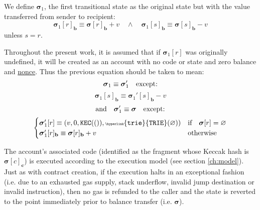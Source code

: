 \documentclass[9pt,oneside]{amsart}
\begin{document}
\begin{multicols}{2}
We define $\boldsymbol{\sigma}_1$, the first transitional state as the original state but with the value transferred from sender to recipient:
\begin{equation}
\boldsymbol{\sigma}_1[r]_\mathbf{b} \equiv \boldsymbol{\sigma}[r]_\mathbf{b} + v \quad\wedge\quad \boldsymbol{\sigma}_1[s]_\mathbf{b} \equiv \boldsymbol{\sigma}[s]_\mathbf{b} - v
\end{equation}
unless $s = r$.

Throughout the present work, it is assumed that if $\boldsymbol{\sigma}_1[r]$ was originally undefined, it will be created as an account with no code or state and zero balance and \hyperlink{account nonce}{nonce}. Thus the previous equation should be taken to mean:
\begin{equation}
\boldsymbol{\sigma}_1 \equiv \boldsymbol{\sigma}_1' \quad \text{except:} \\
\end{equation}
\begin{equation}
\boldsymbol{\sigma}_1[s]_\mathbf{b} \equiv \boldsymbol{\sigma}_1'[s]_\mathbf{b} - v
\end{equation}
\begin{equation}
\text{and}\quad \boldsymbol{\sigma}_1' \equiv \boldsymbol{\sigma} \quad \text{except:} \\
\end{equation}
\begin{equation}
\begin{cases}
\boldsymbol{\sigma}_1'[r] \equiv (v, 0, \mathtt{\tiny KEC}(()), \mathtt{\tiny \hyperlink{trie}{TRIE}}(\varnothing)) & \text{if} \quad \boldsymbol{\sigma}[r] = \varnothing \\
\boldsymbol{\sigma}_1'[r]_\mathbf{b} \equiv \boldsymbol{\sigma}[r]_\mathbf{b} + v & \text{otherwise}
\end{cases}
\end{equation}

The account's associated code (identified as the fragment whose Keccak hash is $\boldsymbol{\sigma}[c]_\mathbf{c}$) is executed according to the execution model (see section \ref{ch:model}). Just as with contract creation, if the execution halts in an exceptional fashion (i.e. due to an exhausted gas supply, stack underflow, invalid jump destination or invalid instruction), then no gas is refunded to the caller and the state is reverted to the point immediately prior to balance transfer (i.e. $\boldsymbol{\sigma}$).


\end{multicols}
\end{document}
